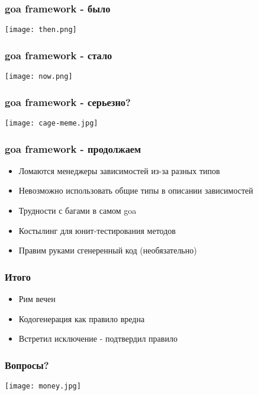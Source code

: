\documentclass[mathserif,serif]{beamer}
\begin{document}
\begin{frame}
	\frametitle{goa framework - было}
	\texttt{[image: then.png]}
\end{frame}

\begin{frame}
	\frametitle{goa framework - стало}
	\texttt{[image: now.png]}
\end{frame}

\begin{frame}
	\frametitle{goa framework - серьезно?}
	\texttt{[image: cage-meme.jpg]}
\end{frame}

\begin{frame}
	\frametitle{goa framework - продолжаем}
	\begin{itemize}
		\item{Ломаются менеджеры зависимостей из-за разных типов}
		\item{Невозможно использовать общие типы в описании зависимостей}
		\item{Трудности с багами в самом goa}
		\item{Костылинг для юнит-тестирования методов}
		\item{Правим руками сгенеренный код (необязательно)}
	\end{itemize}
\end{frame}

\begin{frame}
	\frametitle{Итого}
	\begin{itemize}
		\item{Рим вечен}
		\item{Кодогенерация как правило вредна}
		\item{Встретил исключение - подтвердил правило}
	\end{itemize}
\end{frame}

\begin{frame}
	\frametitle{Вопросы?}
	\texttt{[image: money.jpg]}
\end{frame}
\end{document}
